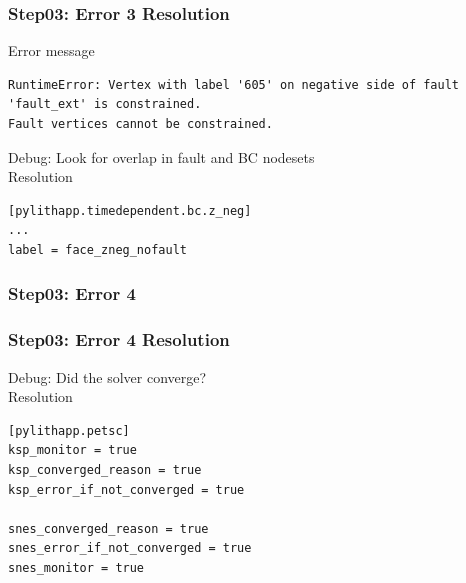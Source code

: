 \documentclass{beamer}
\newcommand{\errlabel}[1]{{\small \color{blue}#1}}
\newcommand{\debuginfo}[1]{{\small \color{green}#1}}
\begin{document}
\begin{frame}[fragile]
  \frametitle{Step03: Error 3 Resolution}

\errlabel{Error message}
\begin{lstlisting}
RuntimeError: Vertex with label '605' on negative side of fault 'fault_ext' is constrained.
Fault vertices cannot be constrained.
\end{lstlisting}\pause
\errlabel{Debug:} \debuginfo{Look for overlap in fault and BC nodesets}\pause\\
\errlabel{Resolution}
\begin{lstlisting}
[pylithapp.timedependent.bc.z_neg]
...
label = face_zneg_nofault
\end{lstlisting}

\end{frame}


\begin{frame}[fragile]
  \frametitle{Step03: Error 4}

  \begin{center}
  \end{center}
  
\end{frame}


\begin{frame}[fragile]
  \frametitle{Step03: Error 4 Resolution}

\errlabel{Debug:} \debuginfo{Did the solver converge?}\pause\\
\errlabel{Resolution}
\begin{lstlisting}
[pylithapp.petsc]
ksp_monitor = true
ksp_converged_reason = true
ksp_error_if_not_converged = true

snes_converged_reason = true
snes_error_if_not_converged = true
snes_monitor = true
\end{lstlisting}

\end{frame}
\end{document}
